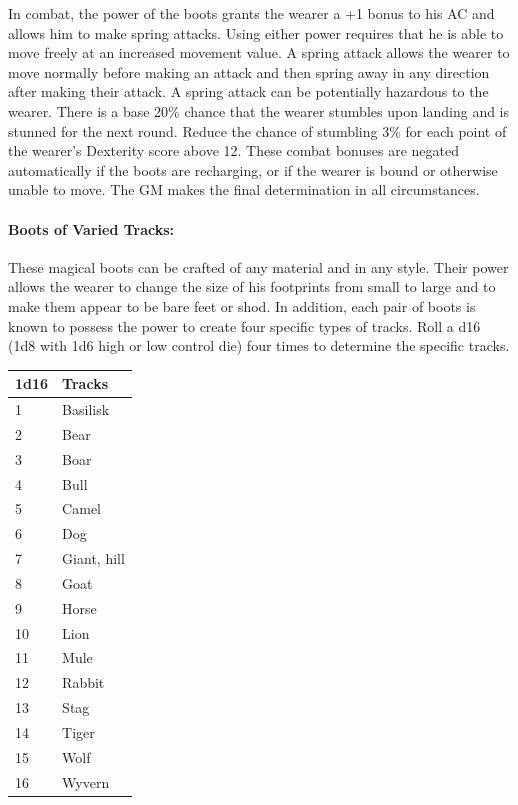 \begin{multicols}{2}
In combat, the power of the boots grants the wearer a +1 bonus to his AC and allows him to make spring attacks.  Using either power requires that he is able to move freely at an increased movement value.  A spring attack allows the wearer to move normally before making an attack and then spring away in any direction after making their attack.  A spring attack can be potentially hazardous to the wearer.  There is a base 20\% chance that the wearer stumbles upon landing and is stunned for the next round.  Reduce the chance of stumbling 3\% for each point of the wearer's Dexterity score above 12.  These combat bonuses are negated automatically if the boots are recharging, or if the wearer is bound or otherwise unable to move.  The GM makes the final determination in all circumstances.

\paragraph{Boots of Varied Tracks:} These magical boots can be crafted of any material and in any style.  Their power allows the wearer to change the size of his footprints from small to large and to make them appear to be bare feet or shod.  In addition, each pair of boots is known to possess the power to create four specific types of tracks.  Roll a d16 (1d8 with 1d6 high or low control die) four times to determine the specific tracks.

\noindent
\begin{tabular}{|p{}|p{}|}
\hline
1d16	& Tracks \\
\hline\hline
\rowcolor[gray]{.9}1	& Basilisk \\
2	& Bear \\
\rowcolor[gray]{.9}3	& Boar \\
4	& Bull \\
\rowcolor[gray]{.9}5	& Camel \\
6	& Dog \\
\rowcolor[gray]{.9}7	& Giant, hill \\
8	& Goat \\
\rowcolor[gray]{.9}9	& Horse \\
10	& Lion \\
\rowcolor[gray]{.9}11	& Mule \\
12	& Rabbit \\
\rowcolor[gray]{.9}13	& Stag \\
14	& Tiger \\
\rowcolor[gray]{.9}15	& Wolf \\
16	& Wyvern \\
\hline
\end{tabular}


\end{multicols}
